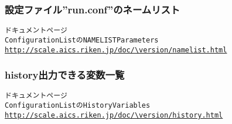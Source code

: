 \subsubsection{設定ファイル''run.conf''のネームリスト} \label{subsubsec:namelist_run}

\begin{alltt}
 \scalerm ドキュメントページ
 Configuration List の NAMELIST Parameters 
 \url{http://scale.aics.riken.jp/doc/\version/namelist.html}
\end{alltt}


\subsubsection{history出力できる変数一覧} \label{subsubsec:histroy_item}

\begin{alltt}
 \scalerm ドキュメントページ
 Configuration List の History Variables
 \url{http://scale.aics.riken.jp/doc/\version/history.html}
\end{alltt}




